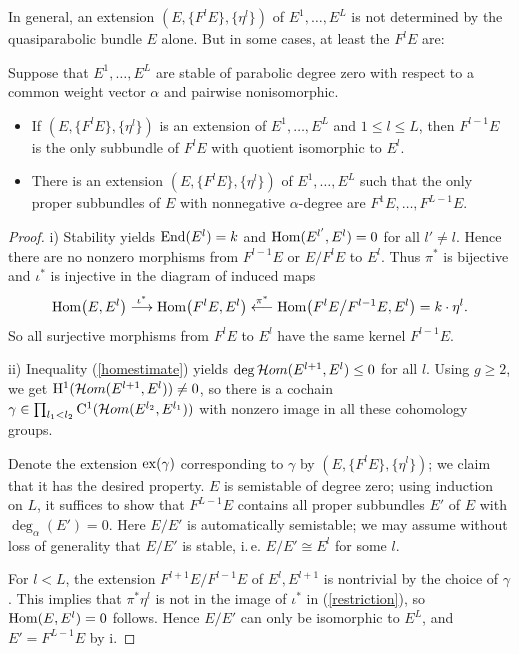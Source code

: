 \documentclass{article}
\begin{document}
In general, an extension $(E, \{F^l E\}, \{\eta^l\})$ of $E^1, \ldots, E^L$ is not determined by the quasiparabolic bundle $E$ alone. But in some cases,
at least the $F^l E$ are:
\begin{lemma} \label{unique}
  Suppose that $E^1, \ldots, E^L$ are stable of parabolic degree zero with respect to a common weight vector $\alpha$ and pairwise nonisomorphic.
  \begin{itemize}
   \item[i)] If $(E, \{F^l E\}, \{\eta^l\})$ is an extension of $E^1, \ldots, E^L$ and $1 \leq l \leq L$, then $F^{l-1} E$ is the only subbundle of
    $F^l E$ with quotient isomorphic to $E^l$.
   \item[ii)] There is an extension $(E, \{F^l E\}, \{\eta^l\})$ of $E^1, \ldots, E^L$ such that the only proper subbundles of $E$ with nonnegative
    $\alpha$-degree are $F^1 E, \ldots, F^{L-1} E$.
  \end{itemize}
\end{lemma}
\begin{proof}
  i) Stability yields $\End(E^l) = k$ and $\Hom(E^{l'}, E^l) = 0$ for all $l' \neq l$. Hence there are no nonzero morphisms from $F^{l-1} E$ or $E/F^l E$
  to $E^l$. Thus $\pi^*$ is bijective and $\iota^*$ is injective in the diagram of induced maps
  \begin{equation} \label{restriction}
    \Hom \big( E, E^l \big) \longto[\iota^*] \Hom \big( F^l E                , E^l \big)
                            \otgnol[  \pi^*] \Hom \big( F^l E \big/ F^{l-1} E, E^l \big) = k \cdot \eta^l.
  \end{equation}
  So all surjective morphisms from $F^l E$ to $E^l$ have the same kernel $F^{l-1} E$.

  ii) Inequality (\ref{homestimate}) yields $\deg \Homsheaf(E^{l+1}, E^l) \leq 0$ for all $l$. Using $g \geq 2$, we get $\cohom^1(\Homsheaf(E^{l+1},
  E^l)) \neq 0$, so there is a cochain $\gamma \in \prod_{l_1<l_2} \chains^1(\Homsheaf(E^{l_2}, E^{l_1}))$
  with nonzero image in all these cohomology groups.

  Denote the extension $\ex(\gamma)$ corresponding to $\gamma$ by $(E, \{F^l E\}, \{\eta^l\})$; we claim that it has the desired property. $E$ is
  semistable of degree zero; using induction on $L$, it suffices to show that $F^{L-1} E$ contains all proper subbundles $E'$ of $E$ with
  $\deg_{\alpha}(E') = 0$. Here $E/E'$ is automatically semistable; we may assume without loss of generality that $E/E'$ is stable, i.\,e. $E/E' \cong
  E^l$ for some $l$.

  For $l<L$, the extension $F^{l+1} E \big/ F^{l-1} E$ of $E^l, E^{l+1}$ is nontrivial by the choice of $\gamma$. This implies that $\pi^* \eta^l$ is not
  in the image of $\iota^*$ in (\ref{restriction}), so $\Hom(E, E^l)=0$ follows. Hence $E/E'$ can only be isomorphic to $E^L$, and $E' = F^{L-1} E$ by i.
\end{proof}
\end{document}
